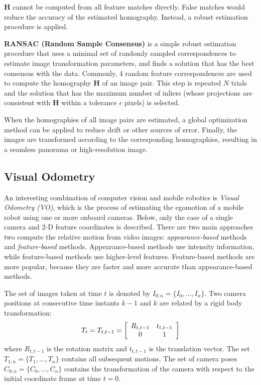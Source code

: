 {$\boldsymbol{H}$ cannot be computed from all feature matches directly.
False matches would reduce the accuracy of the estimated homography.
Instead, a robust estimation procedure is applied.

\textbf{RANSAC (Random Sample Consensus)} \cite{fischler1981random} is a simple robust estimation procedure that uses a minimal set of randomly sampled correspondences to estimate image transformation parameters, and finds a solution that has the best consensus with the data.
Commonly, 4 random feature correspondences are used to compute the homography $\boldsymbol{H}$ of an image pair.
This step is repeated $N$ trials and the solution that has the maximum number of inliers (whose projections are consistent with $\boldsymbol{H}$ within a tolerance $\epsilon$ pixels) is selected.

When the homographies of all image pairs are estimated, a global optimization method can be applied to reduce drift or other sources of error.
Finally, the images are transformed according to the corresponding homographies, resulting in a seamless panorama or high-resolution image. 


\subsection{Visual Odometry}
An interesting combination of computer vision and mobile robotics is \textit{Visual Odometry (VO)}, which is the process of estimating the egomotion of a mobile robot using one or more onboard cameras.
Below, only the case of a single camera and 2-D feature coordinates is described.
There are two main approaches two compute the relative motion from video images: \textit{appearance-based} methods and \textit{feature-based} methods.
Appearance-based methods use intensity information, while feature-based methods use higher-level features.
Feature-based methods are more popular, because they are faster and more accurate than appearance-based methods.

The set of images taken at time $t$ is denoted by $I_{0:n} = \{I_0, \hdots, I_n\}$.
Two camera positions at consecutive time instants $k-1$ and $k$ are related by a rigid body transformation:
\begin{equation}
T_t = T_{t,t-1} = 
\left[ \begin{array}{c c}
R_{t,t-1} & t_{t,t-1} \\
0 & 1
\end{array} \right]
\end{equation}
where $R_{t,t-1}$ is the rotation matrix and $t_{t,t-1}$ is the translation vector.
The set $T_{1:n} = \{T_1, \hdots, T_n\}$ contains all subsequent motions.
The set of camera poses $C_{0:n} = \{C_0, \hdots, C_n\}$ contains the transformation of the camera with respect to the initial coordinate frame at time $t = 0$.

}
